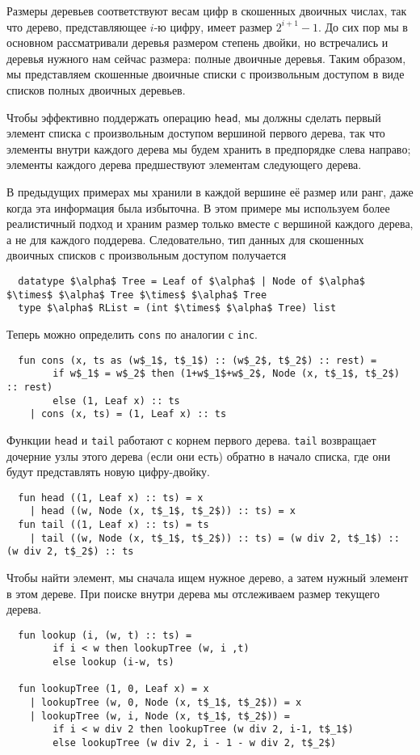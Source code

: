 Размеры деревьев соответствуют весам цифр в скошенных двоичных числах,
так что дерево, представляющее $i$-ю цифру, имеет размер $2^{i+1} -
1$. До сих пор мы в основном рассматривали деревья размером степень
двойки, но встречались и деревья нужного нам сейчас размера: полные
двоичные деревья. Таким образом, мы представляем скошенные двоичные
списки с произвольным доступом в виде списков полных двоичных
деревьев.

Чтобы эффективно поддержать операцию \lstinline!head!, мы должны
сделать первый элемент списка с произвольным доступом вершиной первого
дерева, так что элементы внутри каждого дерева мы будем хранить в
предпорядке слева направо; элементы каждого дерева предшествуют
элементам следующего дерева.

В предыдущих примерах мы хранили в каждой вершине её размер или ранг,
даже когда эта информация была избыточна. В этом примере мы используем
более реалистичный подход и храним размер только вместе с вершиной
каждого дерева, а не для каждого поддерева. Следовательно, тип данных
для скошенных двоичных списков с произвольным доступом получается
\begin{lstlisting}
  datatype $\alpha$ Tree = Leaf of $\alpha$ | Node of $\alpha$ $\times$ $\alpha$ Tree $\times$ $\alpha$ Tree
  type $\alpha$ RList = (int $\times$ $\alpha$ Tree) list
\end{lstlisting}
Теперь можно определить \lstinline!cons! по аналогии с
\lstinline!inc!.
\begin{lstlisting}
  fun cons (x, ts as (w$_1$, t$_1$) :: (w$_2$, t$_2$) :: rest) =
        if w$_1$ = w$_2$ then (1+w$_1$+w$_2$, Node (x, t$_1$, t$_2$) :: rest)
        else (1, Leaf x) :: ts
    | cons (x, ts) = (1, Leaf x) :: ts
\end{lstlisting}
Функции \lstinline!head! и \lstinline!tail! работают с корнем первого
дерева. \lstinline!tail! возвращает дочерние узлы этого дерева (если
они есть) обратно в начало списка, где они будут представлять новую
цифру-двойку.
\begin{lstlisting}
  fun head ((1, Leaf x) :: ts) = x
    | head ((w, Node (x, t$_1$, t$_2$)) :: ts) = x
  fun tail ((1, Leaf x) :: ts) = ts
    | tail ((w, Node (x, t$_1$, t$_2$)) :: ts) = (w div 2, t$_1$) :: (w div 2, t$_2$) :: ts
\end{lstlisting}
Чтобы найти элемент, мы сначала ищем нужное дерево, а затем нужный
элемент в этом дереве. При поиске внутри дерева мы отслеживаем размер
текущего дерева.
\begin{lstlisting}
  fun lookup (i, (w, t) :: ts) = 
        if i < w then lookupTree (w, i ,t)
        else lookup (i-w, ts)

  fun lookupTree (1, 0, Leaf x) = x
    | lookupTree (w, 0, Node (x, t$_1$, t$_2$)) = x
    | lookupTree (w, i, Node (x, t$_1$, t$_2$)) =
        if i < w div 2 then lookupTree (w div 2, i-1, t$_1$)
        else lookupTree (w div 2, i - 1 - w div 2, t$_2$)
\end{lstlisting}
